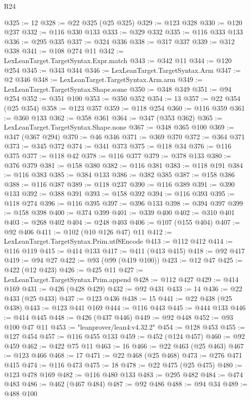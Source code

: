 \begin{lexlean}{R24}
\begin{coremodule}
@325 := 12
@328 := @22 @325 (@25 @325)
@329 := @123 @328
@330 := @120 @237
@332 := @116 @330 @133
@333 := @329 @332
@335 := @116 @333 @133
@336 := @295 @335
@337 := @324 @336
@338 := @317 @337
@339 := @312 @338
@341 := @108 @274 @11
@342 := LexLeanTarget.TargetSyntax.Expr.match
@343 := @342 @11
@344 := @120 @254
@345 := @343 @344
@346 := LexLeanTarget.TargetSyntax.Arm
@347 := @2 @346
@348 := LexLeanTarget.TargetSyntax.Arm.arm
@349 := LexLeanTarget.TargetSyntax.Shape.some
@350 := @348 @349
@351 := @94 @254
@352 := @351 @100
@353 := @350 @352
@354 := 13
@357 := @22 @354 (@25 @354)
@358 := @123 @357
@359 := @118 @254
@360 := @116 @359
@361 := @360 @133
@362 := @358 @361
@364 := @347 (@353 @362)
@365 := LexLeanTarget.TargetSyntax.Shape.none
@367 := @348 @365 @100
@369 := @347 (@367 @294)
@370 := @46 @346
@371 := @369 @370
@372 := @364 @371
@373 := @345 @372
@374 := @341 @373
@375 := @118 @34
@376 := @116 @375
@377 := @118 @42
@378 := @116 @377
@379 := @378 @133
@380 := @376 @379
@381 := @158 @380
@382 := @116 @381
@383 := @118 @191
@384 := @116 @383
@385 := @384 @133
@386 := @382 @385
@387 := @158 @386
@388 := @116 @387
@389 := @118 @237
@390 := @116 @389
@391 := @390 @133
@392 := @388 @391
@393 := @158 @392
@394 := @116 @393
@395 := @118 @274
@396 := @116 @395
@397 := @396 @133
@398 := @394 @397
@399 := @158 @398
@400 := @374 @399
@401 := @339 @400
@402 := @310 @401
@403 := @268 @402
@404 := @248 @403
@406 := @107 (@155 @404)
@407 := @92 @406
@411 := @102 (@10 @126 @47) @11
@412 := LexLeanTarget.TargetSyntax.Prim.utf8Encode
@413 := @112 @412
@414 := @116 @119
@415 := @414 @133
@417 := @411 (@413 @415)
@418 := @92 @417
@419 := @94 @27
@422 := @93 (@99 (@419 @100))
@423 := @12 @47
@425 := @422 (@12 @423)
@426 := @425 @11
@427 := LexLeanTarget.TargetSyntax.Prim.append
@428 := @112 @427
@429 := @414 @169
@431 := @426 (@428 @429)
@432 := @92 @431
@433 := 14
@436 := @22 @433 (@25 @433)
@437 := @123 @436
@438 := 15
@441 := @22 @438 (@25 @438)
@443 := @123 @441 @169
@444 := @116 @443
@445 := @444 @133
@446 := @414 @445
@448 := @426 (@437 @446)
@449 := @92 @448
@452 := @93 @100 @47 @11
@453 := "leanprover/lean4:v4.32.2"
@454 := @128 @453
@455 := @127 @454
@457 := @116 @455 @133
@459 := @452 (@124 @457)
@460 := @92 @459
@462 := @422 @75 @11
@463 := 16
@466 := @22 @463 (@25 @463)
@467 := @123 @466
@468 := 17
@471 := @22 @468 (@25 @468)
@473 := @276 @471 @415
@474 := @116 @473
@475 := 18
@478 := @22 @475 (@25 @475)
@480 := @123 @478 @169
@482 := @116 @480 @133
@483 := @295 @482
@484 := @474 @483
@486 := @462 (@467 @484)
@487 := @92 @486
@488 := @94 @34
@489 := @488 @100

\end{coremodule}
\end{lexlean}
